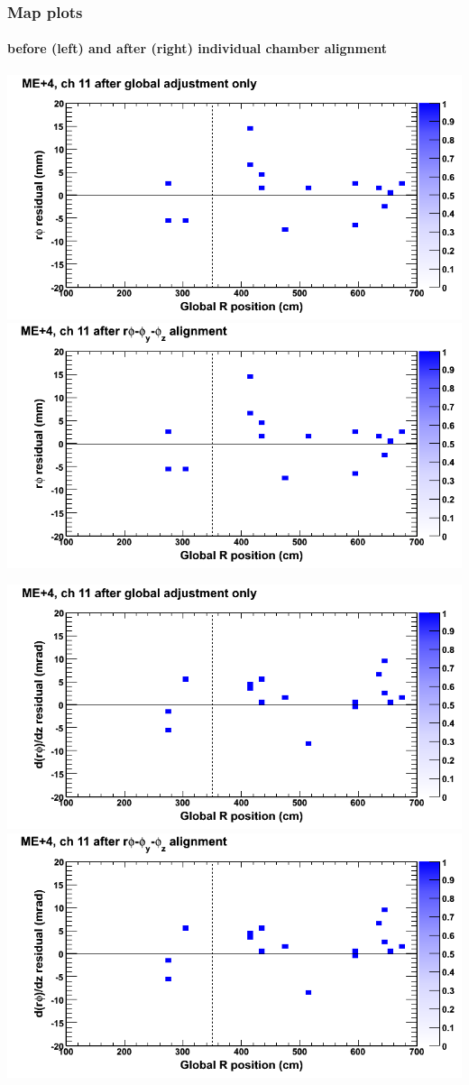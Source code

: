 \documentclass[compress]{beamer}
\begin{document}
\begin{frame}
\frametitle{Map plots}
\framesubtitle{before (left) and after (right) individual chamber alignment}
\includegraphics[width=0.5\linewidth]{ringmapplots_3dof/before_CSCvsr_mep4ch11_x.png} \includegraphics[width=0.5\linewidth]{ringmapplots_3dof/after_CSCvsr_mep4ch11_x.png}

\includegraphics[width=0.5\linewidth]{ringmapplots_3dof/before_CSCvsr_mep4ch11_dxdz.png} \includegraphics[width=0.5\linewidth]{ringmapplots_3dof/after_CSCvsr_mep4ch11_dxdz.png}
\end{frame}
\end{document}

